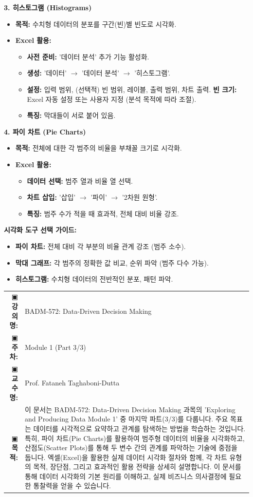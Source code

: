 \documentclass[11pt,a4paper]{article}
\makeatletter
\theoremstyle{definition}
\newcommand{\metainfo}[4]{
\begin{tcolorbox}[
    colback=lightpurple,
    colframe=darkpurple,
    boxrule=1pt,
    arc=2mm,
    left=10pt,
    right=10pt,
    top=8pt,
    bottom=8pt
]
\begin{tabular}{@{}rl@{}}
▣ \textbf{강의명:} & #1 \\[0.3em]
▣ \textbf{주차:} & #2 \\[0.3em]
▣ \textbf{교수명:} & #3 \\[0.3em]
▣ \textbf{목적:} & \begin{minipage}[t]{0.75\textwidth}#4\end{minipage}
\end{tabular}
\end{tcolorbox}
}
\makeatother
\begin{document}
\begin{tcolorbox}[colback=lightblue,colframe=darkblue,title=\textbf{데이터 요약 및 시각화 핵심 도구}]
\textbf{3. 히스토그램 (Histograms)}
\begin{itemize}
    \item \textbf{목적:} 수치형 데이터의 분포를 구간(빈)별 빈도로 시각화.
    \item \textbf{Excel 활용:}
    \begin{itemize}
        \item \textbf{사전 준비:} '데이터 분석' 추가 기능 활성화.
        \item \textbf{생성:} '데이터' $\rightarrow$ '데이터 분석' $\rightarrow$ '히스토그램'.
        \item \textbf{설정:} 입력 범위, (선택적) 빈 범위, 레이블, 출력 범위, 차트 출력.
        \textbf{빈 크기:} Excel 자동 설정 또는 사용자 지정 (분석 목적에 따라 조절).
        \item \textbf{특징:} 막대들이 서로 붙어 있음.
    \end{itemize}
\end{itemize}

\textbf{4. 파이 차트 (Pie Charts)}
\begin{itemize}
    \item \textbf{목적:} 전체에 대한 각 범주의 비율을 부채꼴 크기로 시각화.
    \item \textbf{Excel 활용:}
    \begin{itemize}
        \item \textbf{데이터 선택:} 범주 열과 비율 열 선택.
        \item \textbf{차트 삽입:} '삽입' $\rightarrow$ '파이' $\rightarrow$ '2차원 원형'.
        \item \textbf{특징:} 범주 수가 적을 때 효과적, 전체 대비 비율 강조.
    \end{itemize}
\end{itemize}

\textbf{시각화 도구 선택 가이드:}
\begin{itemize}
    \item \textbf{파이 차트:} 전체 대비 각 부분의 비율 관계 강조 (범주 소수).
    \item \textbf{막대 그래프:} 각 범주의 정확한 값 비교, 순위 파악 (범주 다수 가능).
    \item \textbf{히스토그램:} 수치형 데이터의 전반적인 분포, 패턴 파악.
\end{itemize}
\end{tcolorbox}

\newpage
\thispagestyle{firstpage}
\metainfo{BADM-572: Data-Driven Decision Making}{Module 1 (Part 3/3)}{Prof. Fataneh Taghaboni-Dutta}{이 문서는 BADM-572: Data-Driven Decision Making 과목의 'Exploring and Producing Data Module 1' 중 마지막 파트(3/3)를 다룹니다. 주요 목표는 데이터를 시각적으로 요약하고 관계를 탐색하는 방법을 학습하는 것입니다. 특히, 파이 차트(Pie Charts)를 활용하여 범주형 데이터의 비율을 시각화하고, 산점도(Scatter Plots)를 통해 두 변수 간의 관계를 파악하는 기술에 중점을 둡니다. 엑셀(Excel)을 활용한 실제 데이터 시각화 절차와 함께, 각 차트 유형의 목적, 장단점, 그리고 효과적인 활용 전략을 상세히 설명합니다. 이 문서를 통해 데이터 시각화의 기본 원리를 이해하고, 실제 비즈니스 의사결정에 필요한 통찰력을 얻을 수 있습니다.}
\tableofcontents
\newpage
\end{document}
